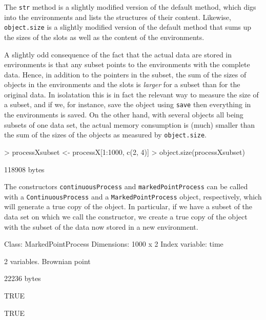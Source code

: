 \documentclass[11pt,a4paper,twoside]{article}
\begin{document}
The \verb+str+ method is a slightly modified version of the default
method, which digs into the environments and lists the structures of
their content. Likewise, \verb+object.size+ is a slightly modified
version of the default method that sums up the sizes of the slots 
as well as the content of the environments. 

A slightly odd consequence of the fact that the actual data are
stored in environments is that any subset points to the environments
with the complete data. Hence, in addition to the pointers in the
subset, the sum of the sizes of objects in the environments and the
slots is \emph{larger} for a subset than for the original
data. In isolatation this is in fact the relevant way to measure the 
size of a subset, and if we, for instance, save the object using \verb+save+ 
then everything in the environments is saved. On the other hand,
with several objects all being subsets of one data set, the actual
memory consumption is (much) smaller than the sum of the sizes of
the objects as measured by \verb+object.size+. 

\begin{Schunk}
\begin{Sinput}
> processXsubset <- processX[1:1000, c(2, 4)]
> object.size(processXsubset)
\end{Sinput}
\begin{Soutput}
118908 bytes
\end{Soutput}
\end{Schunk}

The constructors \verb+continuousProcess+ and
\verb+markedPointProcess+ can be called with a \verb+ContinuousProcess+ and
a \verb+MarkedPointProcess+ object, respectively, which will generate a
true copy of the object. In particular, if we have a subset of
the data set on which we call the constructor, we create a true copy
of the object with the subset of the data now stored in a new
environment. 

\begin{Schunk}
\begin{Soutput}
Class: MarkedPointProcess 
Dimensions: 1000 x 2 
Index variable: time 

2 variables.
   Brownian point
\end{Soutput}
\begin{Soutput}
22236 bytes
\end{Soutput}
\begin{Soutput}
[1] TRUE
\end{Soutput}
\begin{Soutput}
[1] TRUE
\end{Soutput}
\end{Schunk}
\end{document}
